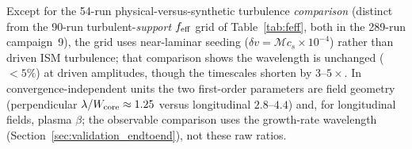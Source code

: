 \documentclass[usenatbib,twoside,twocolumn]{mnras}
\begin{document}
Except for the 54-run physical-versus-synthetic turbulence \emph{comparison} (distinct from the 90-run turbulent-\emph{support} $f_{\rm eff}$ grid of Table~\ref{tab:feff}, both in the 289-run campaign~9), the grid uses near-laminar seeding ($\delta v=\mathcal{M}c_s\times10^{-4}$) rather than driven ISM turbulence; that comparison shows the wavelength is unchanged ($<5\%$) at driven amplitudes, though the timescales shorten by $3$--$5\times$. In convergence-independent units the two first-order parameters are field geometry (perpendicular $\lambda/W_{\rm core}\approx1.25$ versus longitudinal $2.8$--$4.4$) and, for longitudinal fields, plasma $\beta$; the observable comparison uses the growth-rate wavelength (Section~\ref{sec:validation_endtoend}), not these raw ratios.


\end{document}
